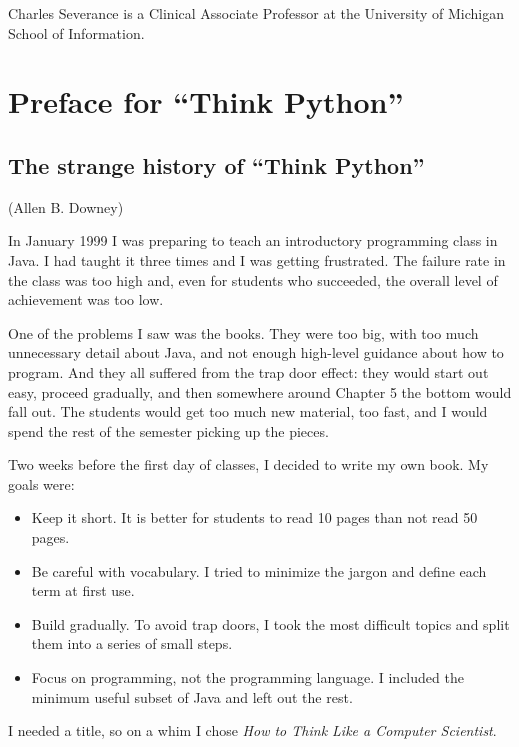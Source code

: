 \documentclass[11pt]{book}
\begin{document}
Charles Severance is a 
Clinical Associate Professor 
at the University of Michigan School of Information.

\section*{Preface for ``Think Python''}

\subsection*{The strange history of ``Think Python''}

(Allen B. Downey)

In January 1999 I was preparing to teach an introductory programming
class in Java.  I had taught it three times and I was getting
frustrated.  The failure rate in the class was too high and, even for
students who succeeded, the overall level of achievement was too low.

One of the problems I saw was the books.  
They were too big, with too much unnecessary detail about Java, and
not enough high-level guidance about how to program.  And they all
suffered from the trap door effect: they would start out easy,
proceed gradually, and then somewhere around Chapter 5 the bottom would
fall out.  The students would get too much new material, too fast,
and I would spend the rest of the semester picking up the pieces.

Two weeks before the first day of classes, I decided to write my
own book.  
My goals were:

\begin{itemize}

\item Keep it short.  It is better for students to read 10 pages
than not read 50 pages.

\item Be careful with vocabulary.  I tried to minimize the jargon
and define each term at first use.

\item Build gradually. To avoid trap doors, I took the most difficult
topics and split them into a series of small steps. 

\item Focus on programming, not the programming language.  I included
the minimum useful subset of Java and left out the rest.

\end{itemize}

I needed a title, so on a whim I chose \emph{How to Think Like
a Computer Scientist}.
\end{document}
